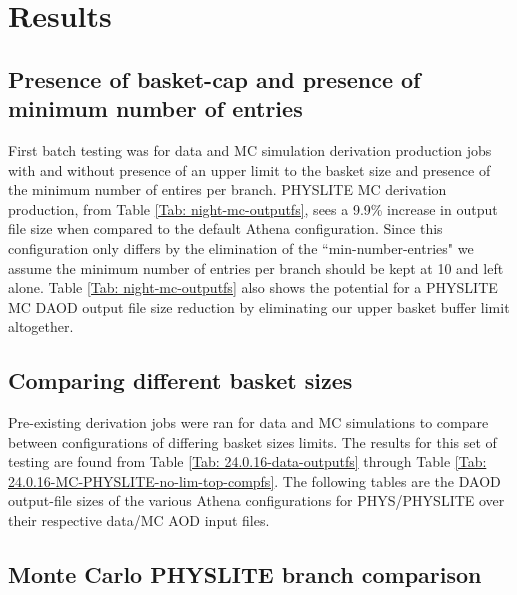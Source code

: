 
\section{Results}
\label{sec:DAODProd_Results}

\subsection{Presence of basket-cap and presence of minimum number of entries}
\label{sec:DAODProd_Results_presence}

First batch testing was for data and MC simulation derivation production jobs with and without presence of an upper limit to the basket size and presence of the minimum number of entires per branch. 
PHYSLITE MC derivation production, from Table \ref{Tab: night-mc-outputfs}, sees a 9.9\% increase in output file size when compared to the default Athena configuration. 
Since this configuration only differs by the elimination of the ``min-number-entries" we assume the minimum number of entries per branch should be kept at 10 and left alone. 
Table \ref{Tab: night-mc-outputfs} also shows the potential for a PHYSLITE MC DAOD output file size reduction by eliminating our upper basket buffer limit altogether.  



\subsection{Comparing different basket sizes}
\label{sec:DAODProd_Results_comparing}

Pre-existing derivation jobs were ran for data and MC simulations to compare between configurations of differing basket sizes limits. 
The results for this set of testing are found from Table \ref{Tab: 24.0.16-data-outputfs} through Table \ref{Tab: 24.0.16-MC-PHYSLITE-no-lim-top-compfs}. 
The following tables are the DAOD output-file sizes of the various Athena configurations for PHYS/PHYSLITE over their respective data/MC AOD input files. 




\subsection{Monte Carlo PHYSLITE branch comparison}
\label{sec:DAODProd_Results_Monte}

